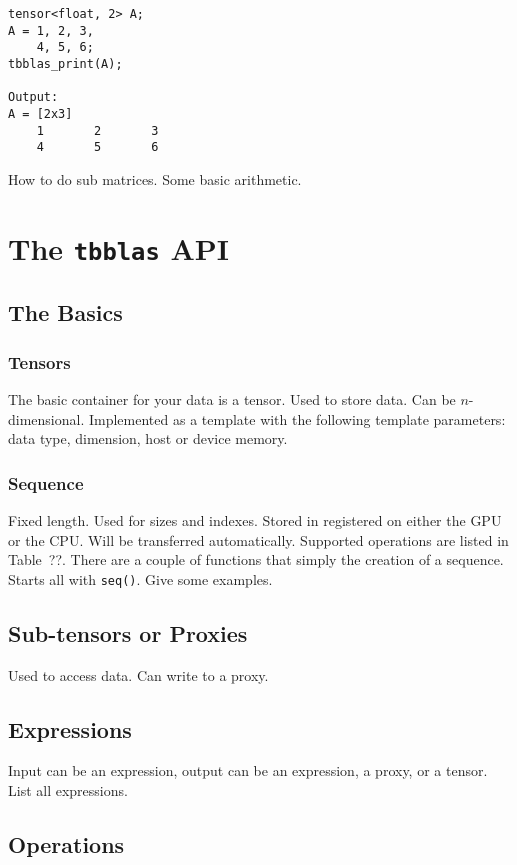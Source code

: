 \documentclass{article}
\newcommand{\tbblas}{\texttt{tbblas}\xspace}
\begin{document}
\begin{verbatim}
tensor<float, 2> A;
A = 1, 2, 3,
    4, 5, 6;
tbblas_print(A);

Output:
A = [2x3]
    1		2		3
    4		5		6
\end{verbatim}

How to do sub matrices. Some basic arithmetic.

\section{The \tbblas API}

\subsection{The Basics}

\subsubsection{Tensors}

The basic container for your data is a tensor. Used to
store data. Can be $n$-dimensional. Implemented as a template with the following
template parameters: data type, dimension, host or device memory.

\subsubsection{Sequence}

Fixed length. Used for sizes and indexes. Stored in registered on either the GPU
or the CPU. Will be transferred automatically. Supported operations are listed
in Table~??. There are a couple of functions that simply the creation of a
sequence. Starts all with \texttt{seq()}. Give some examples.

\subsection{Sub-tensors or Proxies}

Used to access data. Can write to a proxy.

\subsection{Expressions}

Input can be an expression, output can be an expression, a proxy, or a tensor.
List all expressions.

\subsection{Operations}
\end{document}
